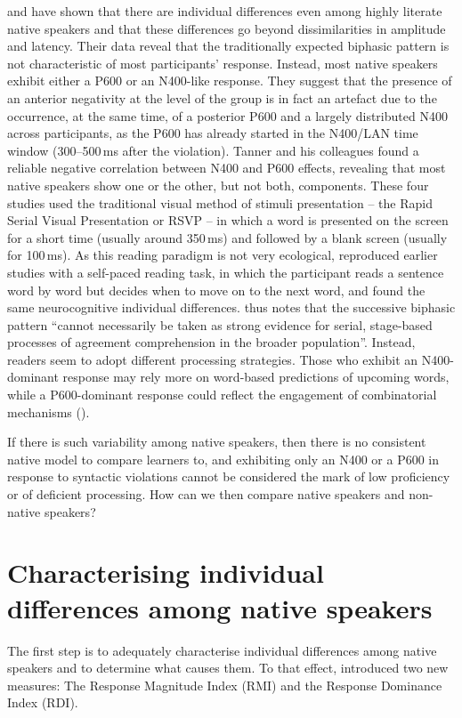 \documentclass[output=paper,colorlinks,citecolor=brown,modfonts,nonflat]{../langscibook}
\begin{document}
\citet{Osterhout1997,TannerEtAl2013,TannerEtAl2014} and \citet{TannerHell2014} have shown that there are individual differences even among highly literate native speakers and that these differences go beyond dissimilarities in amplitude and latency. Their data reveal that the traditionally expected biphasic pattern is not characteristic of most participants’ response. Instead, most native speakers exhibit either a P600 or an N400-like response. They suggest that the presence of an anterior negativity at the level of the group is in fact an artefact due to the occurrence, at the same time, of a posterior P600 and a largely distributed N400 across participants, as the P600 has already started in the N400/LAN time window (300--500\,ms after the violation). Tanner and his colleagues found a reliable negative correlation between N400 and P600 effects, revealing that most native speakers show one or the other, but not both, components. These four studies used the traditional visual method of stimuli presentation – the Rapid Serial Visual Presentation or RSVP – in which a word is presented on the screen for a short time (usually around 350\,ms) and followed by a blank screen (usually for 100\,ms). As this reading paradigm is not very ecological, \citet{Tanner2019} reproduced earlier studies with a self-paced reading task, in which the participant reads a sentence word by word but decides when to move on to the next word, and found the same neurocognitive individual differences. \citet[232]{Tanner2019} thus notes that the successive biphasic pattern “cannot necessarily be taken as strong evidence for serial, stage-based processes of agreement comprehension in the broader population”. Instead, readers seem to adopt different processing strategies. Those who exhibit an N400-dominant response may rely more on word-based predictions of upcoming words, while a P600-dominant response could reflect the engagement of combinatorial mechanisms (\citealt{TannerHell2014}).

If there is such variability among native speakers, then there is no consistent native model to compare learners to, and exhibiting only an N400 or a P600 in response to syntactic violations cannot be considered the mark of low proficiency or of deficient processing. How can we then compare native speakers and non-native speakers? 

\section{Characterising individual differences among native speakers}
The first step is to adequately characterise individual differences among native speakers and to determine what causes them. To that effect, \citet{TannerEtAl2014} introduced two new measures: The Response Magnitude Index (RMI) and the Response Dominance Index (RDI). 
\end{document}
